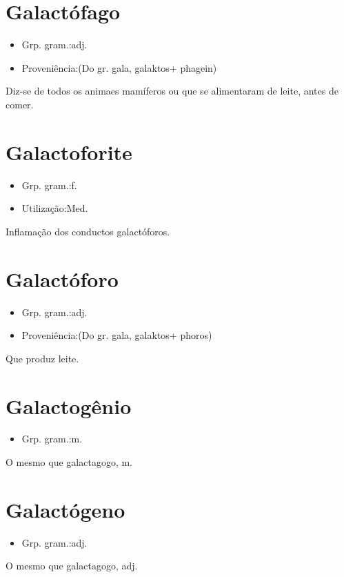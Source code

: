 \section{Galactófago}
\begin{itemize}
\item {Grp. gram.:adj.}
\end{itemize}
\begin{itemize}
\item {Proveniência:(Do gr. \textunderscore gala\textunderscore , \textunderscore galaktos\textunderscore  + \textunderscore phagein\textunderscore )}
\end{itemize}
Diz-se de todos os animaes mamíferos ou que se alimentaram de leite, antes de comer.
\section{Galactoforite}
\begin{itemize}
\item {Grp. gram.:f.}
\end{itemize}
\begin{itemize}
\item {Utilização:Med.}
\end{itemize}
Inflamação dos conductos galactóforos.
\section{Galactóforo}
\begin{itemize}
\item {Grp. gram.:adj.}
\end{itemize}
\begin{itemize}
\item {Proveniência:(Do gr. \textunderscore gala\textunderscore , \textunderscore galaktos\textunderscore  + \textunderscore phoros\textunderscore )}
\end{itemize}
Que produz leite.
\section{Galactogênio}
\begin{itemize}
\item {Grp. gram.:m.}
\end{itemize}
O mesmo que \textunderscore galactagogo\textunderscore , m.
\section{Galactógeno}
\begin{itemize}
\item {Grp. gram.:adj.}
\end{itemize}
O mesmo que \textunderscore galactagogo\textunderscore , adj.
